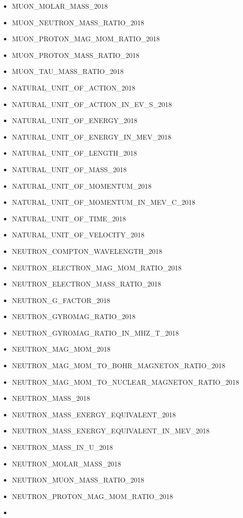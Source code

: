 \begin{itemize}
  MUON\_MASS\_IN\_U\_2018
\item
  MUON\_MOLAR\_MASS\_2018
\item
  MUON\_NEUTRON\_MASS\_RATIO\_2018
\item
  MUON\_PROTON\_MAG\_MOM\_RATIO\_2018
\item
  MUON\_PROTON\_MASS\_RATIO\_2018
\item
  MUON\_TAU\_MASS\_RATIO\_2018
\item
  NATURAL\_UNIT\_OF\_ACTION\_2018
\item
  NATURAL\_UNIT\_OF\_ACTION\_IN\_EV\_S\_2018
\item
  NATURAL\_UNIT\_OF\_ENERGY\_2018
\item
  NATURAL\_UNIT\_OF\_ENERGY\_IN\_MEV\_2018
\item
  NATURAL\_UNIT\_OF\_LENGTH\_2018
\item
  NATURAL\_UNIT\_OF\_MASS\_2018
\item
  NATURAL\_UNIT\_OF\_MOMENTUM\_2018
\item
  NATURAL\_UNIT\_OF\_MOMENTUM\_IN\_MEV\_C\_2018
\item
  NATURAL\_UNIT\_OF\_TIME\_2018
\item
  NATURAL\_UNIT\_OF\_VELOCITY\_2018
\item
  NEUTRON\_COMPTON\_WAVELENGTH\_2018
\item
  NEUTRON\_ELECTRON\_MAG\_MOM\_RATIO\_2018
\item
  NEUTRON\_ELECTRON\_MASS\_RATIO\_2018
\item
  NEUTRON\_G\_FACTOR\_2018
\item
  NEUTRON\_GYROMAG\_RATIO\_2018
\item
  NEUTRON\_GYROMAG\_RATIO\_IN\_MHZ\_T\_2018
\item
  NEUTRON\_MAG\_MOM\_2018
\item
  NEUTRON\_MAG\_MOM\_TO\_BOHR\_MAGNETON\_RATIO\_2018
\item
  NEUTRON\_MAG\_MOM\_TO\_NUCLEAR\_MAGNETON\_RATIO\_2018
\item
  NEUTRON\_MASS\_2018
\item
  NEUTRON\_MASS\_ENERGY\_EQUIVALENT\_2018
\item
  NEUTRON\_MASS\_ENERGY\_EQUIVALENT\_IN\_MEV\_2018
\item
  NEUTRON\_MASS\_IN\_U\_2018
\item
  NEUTRON\_MOLAR\_MASS\_2018
\item
  NEUTRON\_MUON\_MASS\_RATIO\_2018
\item
  NEUTRON\_PROTON\_MAG\_MOM\_RATIO\_2018
\item

\end{itemize}
